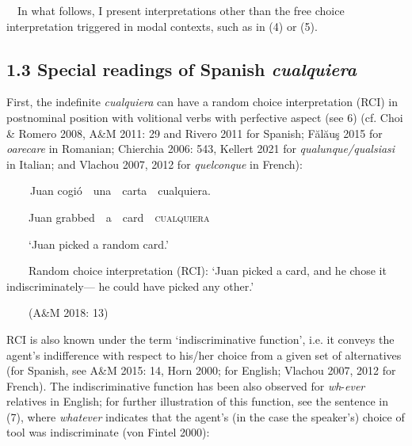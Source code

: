 \begin{styleStandard}
\ \ In what follows, I present interpretations other than the free choice interpretation triggered in modal contexts, such as in (4) or (5).
\end{styleStandard}

\subsection[1.3 Special readings of Spanish cualquiera]{1.3 Special readings of Spanish \textit{cualquiera}}
\begin{styleStandard}
First, the indefinite \textit{cualquiera} can have a random choice interpretation (RCI) in postnominal position with volitional verbs with perfective aspect (see 6) (cf. Choi \& Romero 2008, A\&M 2011: 29 and Rivero 2011 for Spanish; Fălăuş 2015 for \textit{oarecare }in Romanian; Chierchia 2006: 543, Kellert 2021 for \textit{qualunque/qualsiasi} in Italian; and Vlachou 2007, 2012 for \textit{quelconque }in French):
\end{styleStandard}

\begin{styleStandard}
\textbf{\ \ }\ \ Juan cogió\ \ una\ \ carta\ \ cualquiera.
\end{styleStandard}

\begin{styleStandard}
\ \ \ \ Juan grabbed\ \ a\ \ card\ \ \textsc{cualquiera}
\end{styleStandard}

\begin{styleStandard}
\ \ \ \ ‘Juan picked a random card.’
\end{styleStandard}

\begin{styleStandard}
\ \ \ \ Random choice interpretation (RCI): ‘Juan picked a card, and he chose it indiscriminately— he could have picked any other.’
\end{styleStandard}

\begin{styleStandard}
\ \ \ \ (A\&M 2018: 13)
\end{styleStandard}

\begin{styleStandard}
RCI is also known under the term ‘indiscriminative function’, i.e. it conveys the agent’s indifference with respect to his/her choice from a given set of alternatives (for Spanish, see A\&M 2015: 14, Horn 2000; for English; Vlachou 2007, 2012 for French). The indiscriminative function has been also observed for \textit{wh}{}-\textit{ever} relatives in English; for further illustration of this function, see the sentence in (7), where \textit{whatever} indicates that the agent’s (in the case the speaker’s) choice of tool was indiscriminate (von Fintel 2000):
\end{styleStandard}

